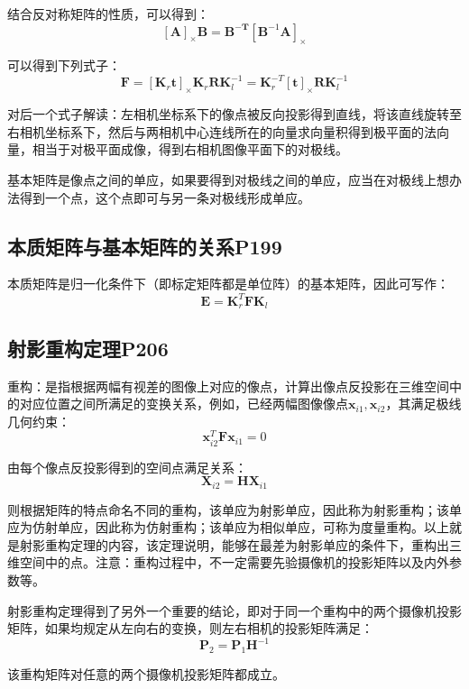 \documentclass[11pt]{article}
\begin{document}
结合反对称矩阵的性质，可以得到：
\begin{equation*}
  \mathbold{[A]_\times B}=\mathbold{B^{-T}}\mathbf{[B^\mathrm{-1}A]_\times}
\end{equation*}\par
可以得到下列式子：
\begin{equation*}
  \mathbold{F}=[\mathbf{K}_r\mathbf{t}]_\times\mathbf{K}_r\mathbf{R}\mathbf{K}_l^{-1}=\mathbf{K}_r^{-T}[\mathbf{t}]_\times\mathbf{R}\mathbf{K}_l^{-1}
\end{equation*}\par
对后一个式子解读：左相机坐标系下的像点被反向投影得到直线，将该直线旋转至右相机坐标系下，然后与两相机中心连线所在的向量求向量积得到极平面的法向量，相当于对极平面成像，得到右相机图像平面下的对极线。\par
基本矩阵是像点之间的单应，如果要得到对极线之间的单应，应当在对极线上想办法得到一个点，这个点即可与另一条对极线形成单应。
\subsection{本质矩阵与基本矩阵的关系P199}
本质矩阵是归一化条件下（即标定矩阵都是单位阵）的基本矩阵，因此可写作：
\begin{equation*}
  \mathbold{E}=\mathbold{K}^T_r\mathbold{FK}_l
\end{equation*}\par
\subsection{射影重构定理P206}
重构：是指根据两幅有视差的图像上对应的像点，计算出像点反投影在三维空间中的对应位置之间所满足的变换关系，例如，已经两幅图像像点$\mathbf{x}_{i1},\mathbf{x}_{i2}$，其满足极线几何约束：
\begin{equation*}
  \mathbf{x}_{i2}^T\mathbf{Fx}_{i1}=0
\end{equation*}\par
由每个像点反投影得到的空间点满足关系：
\begin{equation*}
  \mathbf{X}_{i2}=\mathbf{HX}_{i1}
\end{equation*}\par
则根据矩阵的特点命名不同的重构，该单应为射影单应，因此称为射影重构；该单应为仿射单应，因此称为仿射重构；该单应为相似单应，可称为度量重构。以上就是射影重构定理的内容，该定理说明，能够在最差为射影单应的条件下，重构出三维空间中的点。注意：重构过程中，不一定需要先验摄像机的投影矩阵以及内外参数等。\par
射影重构定理得到了另外一个重要的结论，即对于同一个重构中的两个摄像机投影矩阵，如果均规定从左向右的变换，则左右相机的投影矩阵满足：
\begin{equation*}
  \mathbf{P}_2=\mathbf{P}_1\mathbf{H}^{-1}
\end{equation*}\par
该重构矩阵对任意的两个摄像机投影矩阵都成立。
\end{document}
